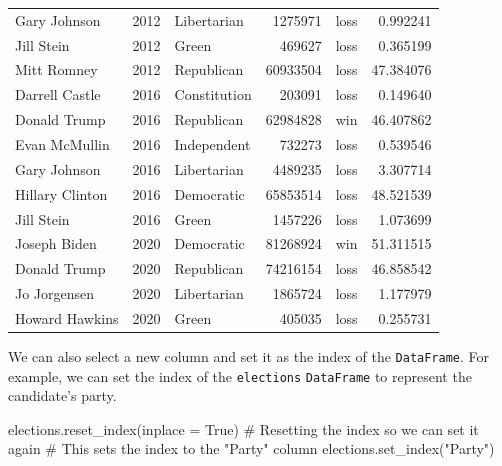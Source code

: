 \documentclass[
  letterpaper,
  DIV=11,
  numbers=noendperiod]{scrreprt}
\newenvironment{Shaded}{\begin{snugshade}}{\end{snugshade}}
\newcommand{\CommentTok}[1]{\textcolor[rgb]{0.37,0.37,0.37}{#1}}
\newcommand{\NormalTok}[1]{\textcolor[rgb]{0.00,0.23,0.31}{#1}}
\newcommand{\OperatorTok}[1]{\textcolor[rgb]{0.37,0.37,0.37}{#1}}
\newcommand{\StringTok}[1]{\textcolor[rgb]{0.13,0.47,0.30}{#1}}
\newcommand{\VariableTok}[1]{\textcolor[rgb]{0.07,0.07,0.07}{#1}}
\begin{document}
\begin{tabular}{lrlrlr}
Gary Johnson           &  2012 &            Libertarian &       1275971 &   loss &   0.992241 \\
Jill Stein             &  2012 &                  Green &        469627 &   loss &   0.365199 \\
Mitt Romney            &  2012 &             Republican &      60933504 &   loss &  47.384076 \\
Darrell Castle         &  2016 &           Constitution &        203091 &   loss &   0.149640 \\
Donald Trump           &  2016 &             Republican &      62984828 &    win &  46.407862 \\
Evan McMullin          &  2016 &            Independent &        732273 &   loss &   0.539546 \\
Gary Johnson           &  2016 &            Libertarian &       4489235 &   loss &   3.307714 \\
Hillary Clinton        &  2016 &             Democratic &      65853514 &   loss &  48.521539 \\
Jill Stein             &  2016 &                  Green &       1457226 &   loss &   1.073699 \\
Joseph Biden           &  2020 &             Democratic &      81268924 &    win &  51.311515 \\
Donald Trump           &  2020 &             Republican &      74216154 &   loss &  46.858542 \\
Jo Jorgensen           &  2020 &            Libertarian &       1865724 &   loss &   1.177979 \\
Howard Hawkins         &  2020 &                  Green &        405035 &   loss &   0.255731 \\
\bottomrule
\end{tabular}

We can also select a new column and set it as the index of the
\texttt{DataFrame}. For example, we can set the index of the
\texttt{elections} \texttt{DataFrame} to represent the candidate's
party.

\begin{Shaded}
\begin{Highlighting}[]
\NormalTok{elections.reset\_index(inplace }\OperatorTok{=} \VariableTok{True}\NormalTok{) }\CommentTok{\# Resetting the index so we can set it again}
\CommentTok{\# This sets the index to the "Party" column}
\NormalTok{elections.set\_index(}\StringTok{"Party"}\NormalTok{)}
\end{Highlighting}
\end{Shaded}
\end{document}
